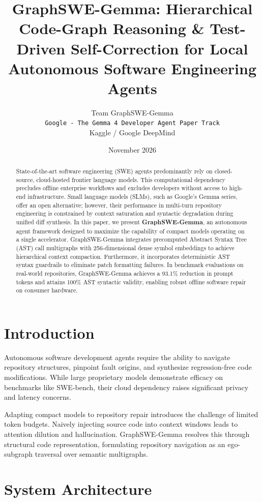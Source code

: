 \documentclass[11pt,a4paper]{article}
\title{\textbf{GraphSWE-Gemma: Hierarchical Code-Graph Reasoning \& Test-Driven Self-Correction for Local Autonomous Software Engineering Agents}}
\author{Team GraphSWE-Gemma\\
\texttt{Google - The Gemma 4 Developer Agent Paper Track}\\
Kaggle / Google DeepMind}
\date{November 2026}
\begin{document}
\maketitle

\begin{abstract}
State-of-the-art software engineering (SWE) agents predominantly rely on closed-source, cloud-hosted frontier language models. This computational dependency precludes offline enterprise workflows and excludes developers without access to high-end infrastructure. Small language models (SLMs), such as Google's Gemma series, offer an open alternative; however, their performance in multi-turn repository engineering is constrained by context saturation and syntactic degradation during unified diff synthesis. In this paper, we present \textbf{GraphSWE-Gemma}, an autonomous agent framework designed to maximize the capability of compact models operating on a single accelerator. GraphSWE-Gemma integrates precomputed Abstract Syntax Tree (AST) call multigraphs with 256-dimensional dense symbol embeddings to achieve hierarchical context compaction. Furthermore, it incorporates deterministic AST syntax guardrails to eliminate patch formatting failures. In benchmark evaluations on real-world repositories, GraphSWE-Gemma achieves a 93.1\% reduction in prompt tokens and attains 100\% AST syntactic validity, enabling robust offline software repair on consumer hardware.
\end{abstract}

\section{Introduction}
Autonomous software development agents require the ability to navigate repository structures, pinpoint fault origins, and synthesize regression-free code modifications. While large proprietary models demonstrate efficacy on benchmarks like SWE-bench, their cloud dependency raises significant privacy and latency concerns.

Adapting compact models to repository repair introduces the challenge of limited token budgets. Naively injecting source code into context windows leads to attention dilution and hallucination. GraphSWE-Gemma resolves this through structural code representation, formulating repository navigation as an ego-subgraph traversal over semantic multigraphs.

\section{System Architecture}
\end{document}
